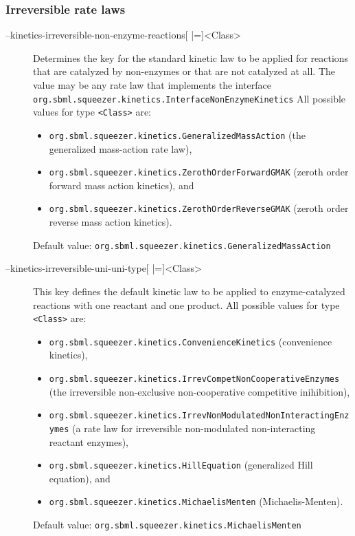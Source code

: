 \subsubsection{Irreversible rate laws}
\begin{description}
\item[--kinetics-irreversible-non-enzyme-reactions{[} |={]}<Class>]
  Determines the key for the standard kinetic law to be applied
  for reactions that are catalyzed by non-enzymes or that are
  not catalyzed at all. The value may be any rate law that implements the
  interface
  \texttt{org.sbml.squeezer.kinetics.InterfaceNonEnzymeKinetics}
  All possible values for type \texttt{<Class>} are:
  \begin{itemize}
  \item\texttt{org.sbml.squeezer.kinetics.GeneralizedMassAction} (the generalized mass-action rate law),
  \item\texttt{org.sbml.squeezer.kinetics.ZerothOrderForwardGMAK} (zeroth order forward mass action kinetics), and
  \item\texttt{org.sbml.squeezer.kinetics.ZerothOrderReverseGMAK} (zeroth order reverse mass action kinetics).
  \end{itemize}
  Default value: \texttt{org.sbml.squeezer.kinetics.GeneralizedMassAction}

\item[--kinetics-irreversible-uni-uni-type{[} |={]}<Class>]
  This key defines the default kinetic law to be applied to enzyme-catalyzed
  reactions with one reactant and one product.
  All possible values for type \texttt{<Class>} are:
  \begin{itemize}
  \item\texttt{org.sbml.squeezer.kinetics.ConvenienceKinetics} (convenience kinetics),
  \item\texttt{org.sbml.squeezer.kinetics.IrrevCompetNonCooperativeEnzymes} (the irreversible non-exclusive non-cooperative competitive inihibition),
  \item\texttt{org.sbml.squeezer.kinetics.IrrevNonModulatedNonInteractingEnzymes} (a rate law for irreversible non-modulated non-interacting reactant enzymes),
  \item\texttt{org.sbml.squeezer.kinetics.HillEquation} (generalized Hill equation), and
  \item\texttt{org.sbml.squeezer.kinetics.MichaelisMenten} (Michaelis-Menten).
  \end{itemize}
  Default value: \texttt{org.sbml.squeezer.kinetics.MichaelisMenten}


\end{description}

